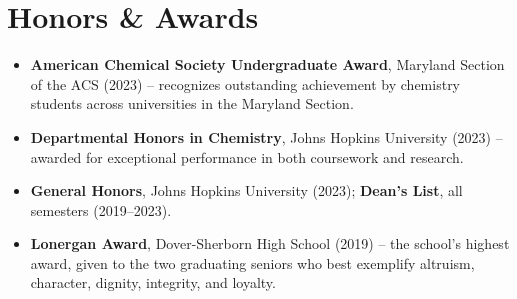 \documentclass[letterpaper,10pt]{article}
\newcommand{\resumeLineListStart}{\begin{itemize}[leftmargin=0.15in, label={}, itemsep=1pt, topsep=2pt]\small}
\newcommand{\resumeLineListEnd}{\end{itemize}}
\begin{document}
\section{Honors \& Awards}
\resumeLineListStart
    \item \textbf{American Chemical Society Undergraduate Award}, Maryland Section of the ACS (2023) -- recognizes outstanding achievement by chemistry students across universities in the Maryland Section.
    \item \textbf{Departmental Honors in Chemistry}, Johns Hopkins University (2023) -- awarded for exceptional performance in both coursework and research.
    \item \textbf{General Honors}, Johns Hopkins University (2023); \textbf{Dean's List}, all semesters (2019--2023).
    \item \textbf{Lonergan Award}, Dover-Sherborn High School (2019) -- the school's highest award, given to the two graduating seniors who best exemplify altruism, character, dignity, integrity, and loyalty.
\resumeLineListEnd

\end{document}
